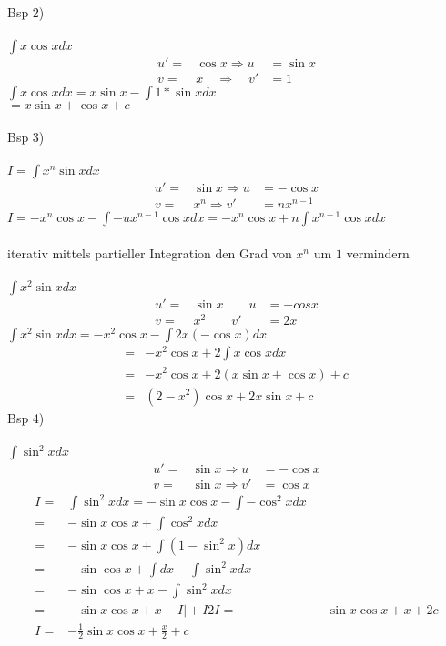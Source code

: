 \documentclass[fleqn,a4paper]{scrartcl}
\begin{document}
Bsp 2) \\\\ {\large $ \int x \cos x dx $ }
\begin{eqnarray*}
u' =& \cos x \Rightarrow u &= \sin x \\
v =& x \quad \Rightarrow \quad v' &= 1 
\end{eqnarray*}
$
\int x \cos x dx = x \sin x - \int 1*\sin x dx $ \\$
= x \sin x + \cos x + c
$ \\\\ Bsp 3)\\\\ {\large $ I = \int x^n \sin x dx $  }
\begin{eqnarray*}
u' =& \sin x \Rightarrow u &= -\cos x \\
v =& x^n \Rightarrow v' &= n x^{n-1}
\end{eqnarray*}
$
I= -x^n \cos x - \int - ux^{n -1}  \cos x dx = -x^n \cos x + n \int x^{n-1} \cos x dx$ \\\\ iterativ mittels partieller Integration den Grad von $ x^n$ um $ 1 $ vermindern \\\\$
\int x^2 \sin x dx 
$
\begin{eqnarray*}
u' =& \sin x \qquad u &= -cos x \\
v =& x^2 \qquad v' &= 2x
\end{eqnarray*}
$
\int x^2 \sin x dx = -x^2 \cos x - \int 2x (-\cos x) dx$ \\ 
\begin{eqnarray*}
=& -x^2 \cos x +2 \int x \cos x dx \\
=& -x^2 \cos x + 2 (x \sin x + \cos x) +c \\
=& (2 - x^2) \cos x + 2 x \sin x +c
\end{eqnarray*}
Bsp 4) \\\\
$ \int \sin^2 x dx $ \\ 
\begin{eqnarray*}
u' =& \sin x \Rightarrow u &= -\cos x \\
v =& \sin x \Rightarrow v' &= \cos x
\end{eqnarray*}
\begin{eqnarray*}
I =& \int \sin^2 x dx = - \sin x \cos x - \int - \cos^2 x dx \\
=& -\sin x \cos x + \int \cos^2 x dx \\
=& -\sin x \cos x + \int (1-\sin^2 x) dx \\
=& -\sin \cos x + \int dx - \int \sin^2 x dx \\
=& -\sin \cos x + x- \int \sin^2 x dx \\
=& -\sin x \cos x + x - I \vert + I
2 I=& - \sin x \cos x + x + 2c \\
I =& - \frac{1}{2} \sin x \cos x + \frac{x}{2} +c \\ 
\end{eqnarray*}
\end{document}
